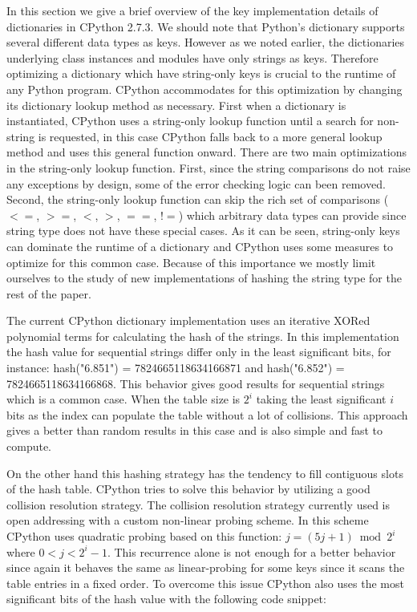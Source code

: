 \documentclass[11pt]{article}
\begin{document}
In this section we give a brief overview of the key implementation details of
dictionaries in CPython 2.7.3.  We should note that Python's dictionary supports
several different data types as keys. However as we noted earlier, the
dictionaries underlying class instances and modules have only strings as keys.
Therefore optimizing a dictionary which have string-only keys is crucial to the
runtime of any Python program. CPython accommodates for this optimization by
changing its dictionary lookup method as necessary. First when a dictionary is
instantiated, CPython uses a string-only lookup function until a search for
non-string is requested, in this case CPython falls back to a more general
lookup method and uses this general function onward. There are two main
optimizations in the string-only lookup function.  First, since the string
comparisons do not raise any exceptions by design, some of the error checking
logic can been removed. Second, the string-only lookup function can skip the
rich set of comparisons ( $<=$, $>=$, $<$, $>$, $==$, $!=$) which arbitrary data
types can provide since string type does not have these special cases.  As it
can be seen, string-only keys can dominate the runtime of a dictionary and
CPython uses some measures to optimize for this common case. Because of this
importance we mostly limit ourselves to the study of new implementations of
hashing the string type for the rest of the paper.

The current CPython dictionary implementation uses an iterative XORed polynomial
terms for calculating the hash of the strings. In this implementation the hash
value for sequential strings differ only in the least significant bits, for
instance: hash("6.851") = 7824665118634166871 and hash("6.852") =
7824665118634166868. This behavior gives good results for sequential strings
which is a common case. When the table size is $2^i$ taking the least
significant $i$ bits as the index can populate the table without a lot of
collisions. This approach gives a better than random results in this case and is
also simple and fast to compute.

On the other hand this hashing strategy has the tendency to fill contiguous
slots of the hash table. CPython tries to solve this behavior by utilizing a
good collision resolution strategy. The collision resolution strategy currently
used is open addressing with a custom non-linear probing scheme. In this scheme
CPython uses quadratic probing based on this function: $j = (5j + 1) \bmod 2^i$
where $0<j<2^i-1$. This recurrence alone is not enough for a better behavior
since again it behaves the same as linear-probing for some keys since it scans
the table entries in a fixed order. To overcome this issue CPython also uses the
most significant bits of the hash value with the following code snippet:
\end{document}

